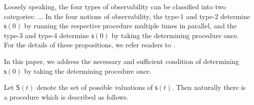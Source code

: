 Loosely speaking, the four types of observability can be classified into two categories: ...
In the four notions of observability, the type-1 and type-2 determine $\mathsf{s}(0)$ by running the respective procedure multiple times in parallel, and the type-3 and type-4 determine $\mathsf{s}(0)$ by taking the determining procedure once. For the details of these propositions, we refer readers to \cite{cheng2009controllability, Zhao2010Input, Cheng2011Identification,Fornasini2013Observability}. %

In this paper, we address the necessary and sufficient condition of determining $\mathsf{s}(0)$ by taking the determining procedure once. %


Let $\mathsf{S}(t)$ denote the set of possible valuations of $\mathsf{s}(t)$. Then naturally there is a procedure which is described as follows.

 
